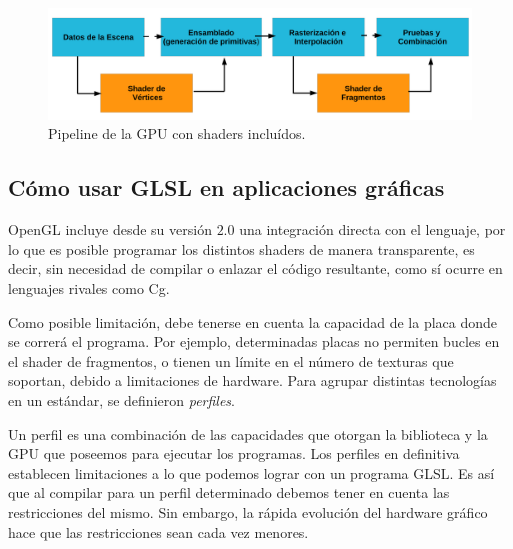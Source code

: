 \begin{figure}[h]
\begin{center}
\includegraphics[width=13cm]{figures/pipelinegrafico}
\end{center}
\caption{Pipeline de la GPU con shaders incluídos.}
\label{fg:pipelinegrafico}
\end{figure}


\subsection{C\'omo usar GLSL en aplicaciones gr\'aficas}
OpenGL incluye desde su versión $2.0$ una integración directa con el lenguaje, por lo que es posible programar los distintos shaders de manera transparente, es decir, sin necesidad de compilar o enlazar el código resultante, como sí ocurre en lenguajes rivales como Cg.

Como posible limitación, debe tenerse en cuenta la capacidad de la placa donde se correrá el programa.
Por ejemplo, determinadas placas no permiten bucles en el shader de fragmentos, o tienen un límite en el número de texturas que soportan, debido a limitaciones de hardware.
Para agrupar distintas tecnologías en un estándar, se definieron {\em perfiles}.

Un perfil es una combinaci\'on de las capacidades que otorgan la biblioteca y la GPU que poseemos para ejecutar los programas. Los perfiles en definitiva establecen limitaciones a lo que podemos lograr con un programa GLSL. Es as\'i que al compilar para un perfil determinado debemos tener en cuenta las restricciones del mismo. Sin embargo, la r\'apida evoluci\'on del hardware gr\'afico hace que las restricciones sean cada vez menores.


